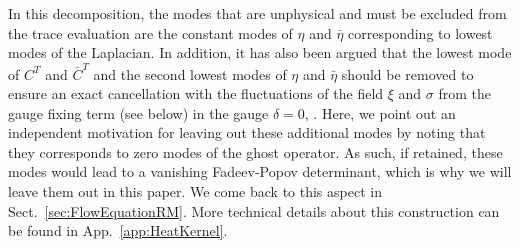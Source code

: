 \documentclass[notitlepage,eqsecnum,bm,amsmath,preprintnumbers,superscriptaddress,nofootinbib,aps,11pt]{revtex4-1}
\begin{document}
In this decomposition, the modes that are unphysical and must be excluded from the trace evaluation are the constant modes of $\eta$ and $\bar\eta$ corresponding to lowest modes of the Laplacian. In addition, it has also been argued  that the lowest mode of $C^T$ and $\bar{C}^T$ and the second lowest modes of  $\eta$ and $\bar\eta$ should be removed to ensure an exact cancellation with the  fluctuations of the field $\xi$ and $\sigma$ from the gauge fixing term (see below) in the gauge $\delta =0$, \cite{Codello:2007bd,Machado:2007ea,Codello:2008vh}. 
Here, we point out an independent motivation for leaving out these additional modes by noting 
that they corresponds to zero modes of the ghost operator. As such, if retained, these modes would lead to a vanishing Fadeev-Popov determinant, which is why we will leave them out in this paper. We come back to this aspect in Sect.~\ref{sec:FlowEquationRM}. More technical details about this construction can be found  in App.~\ref{app:HeatKernel}. 
\end{document}
